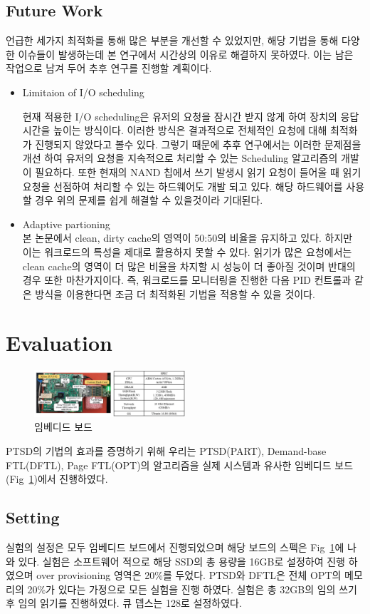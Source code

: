 \documentclass[conference]{IEEEtran}
\begin{document}
\subsection{Future Work}
언급한 세가지 최적화를 통해 많은 부분을 개선할 수 있었지만, 해당 기법을 통해 다양한 이슈들이 
발생하는데 본 연구에서 시간상의 이유로 해결하지 못하였다. 이는 남은 작업으로 남겨 두어 
추후 연구를 진행할 계획이다. 
\begin{itemize}
	\item{Limitaion of I/O scheduling}\par
	현재 적용한 I/O scheduling은 유저의 요청을 잠시간 받지 않게 하여 장치의 응답시간을 높이는 
	방식이다. 이러한 방식은 결과적으로 전체적인 요청에 대해 최적화가 진행되지 않았다고 볼수 있다. 
	그렇기 때문에 추후 연구에서는 이러한 문제점을 개선 하여 유저의 요청을 지속적으로 처리할 수 
	있는 Scheduling 알고리즘의 개발이 필요하다. 또한 현재의 NAND 칩에서 쓰기 발생시 읽기 요청이 
	들어올 때 읽기 요청을 선점하여 처리할 수 있는 하드웨어도 개발 되고 있다. 해당 하드웨어를 
	사용할 경우 위의 문제를 쉽게 해결할 수 있을것이라 기대된다.
	\item{Adaptive partioning}\\
	본 논문에서 clean, dirty cache의 영역이 50:50의 비율을 유지하고 있다. 하지만 이는 워크로드의 
	특성을 제대로 활용하지 못할 수 있다. 읽기가 많은 요청에서는 clean cache의 영역이 더 많은 비율을 
	차지할 시 성능이 더 좋아질 것이며 반대의 경우 또한 마찬가지이다. 즉, 워크로드를 모니터링을 
	진행한 다음 PID 컨트롤과 같은 방식을 이용한다면 조금 더 최적화된 기법을 적용할 수 있을 것이다.
\end{itemize}

\section{Evaluation}
\begin{figure}[h]
	\centering
	\includegraphics[width=0.5\textwidth]{image/EVAL/zync.png}
	\caption{임베디드 보드}
	\label{fig:zync}
\end{figure}
PTSD의 기법의 효과를 증명하기 위해 우리는 PTSD(PART), Demand-base FTL(DFTL), Page FTL(OPT)의 
알고리즘을 실제 시스템과 유사한 임베디드 보드(Fig~\ref{fig:zync})에서 진행하였다.

\subsection{Setting}
실험의 설정은 모두 임베디드 보드에서 진행되었으며 해당 보드의 스펙은 Fig~\ref{fig:zync}에 나와 있다.
실험은 소프트웨어 적으로 해당 SSD의 총 용량을 16GB로 설정하여 진행 하였으며 over provisioning 영역은
20\%를 두었다. PTSD와 DFTL은 전체 OPT의 메모리의 20\%가 있다는 가정으로 모든 실험을 진행 하였다. 
실험은 총 32GB의 임의 쓰기후 임의 읽기를 진행하였다. 큐 뎁스는 128로 설정하였다.
\end{document}
